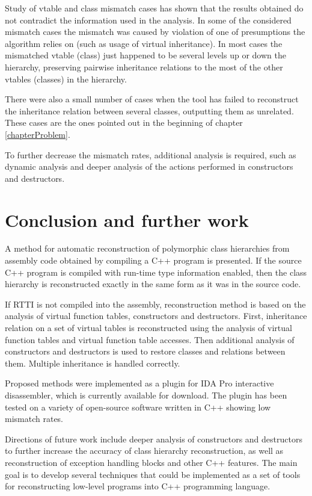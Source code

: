 \documentclass[10pt, conference]{IEEEtran}
\begin{document}
Study of vtable and class mismatch cases has shown that the results obtained
do not contradict the information used in the analysis. In some of the considered
mismatch cases the mismatch was caused by violation of one of presumptions
the algorithm relies on (such as usage of virtual inheritance).
In most cases the mismatched vtable (class) just happened to be
several levels up or down the hierarchy, preserving pairwise inheritance
relations to the most of the other vtables (classes) in the hierarchy.

There were also a small number of cases when the tool has failed to reconstruct
the inheritance relation between several classes, outputting them as unrelated.
These cases are the ones pointed out in the beginning of chapter \ref{chapterProblem}.

To further decrease the
mismatch rates, additional analysis is required, such as dynamic analysis
and deeper analysis of the actions performed in constructors and destructors.





\quad

\section{Conclusion and further work}
A method for automatic reconstruction of polymorphic class hierarchies
from assembly code obtained by compiling a C++ program is presented.
If the source C++ program is compiled with run-time type information enabled,
then the class hierarchy is reconstructed exactly in the same form as it
was in the source code.

If RTTI is not compiled into the assembly, reconstruction
method is based on the analysis of virtual function tables, constructors and destructors.
First, inheritance relation on a set of virtual tables is reconstructed using
the analysis of virtual function tables and virtual function table accesses.
Then additional analysis of constructors and destructors is used to restore
classes and relations between them. Multiple inheritance is handled
correctly.

Proposed methods were implemented as a plugin for IDA Pro interactive disassembler,
which is currently available for download.
The plugin has been tested on a variety of open-source software written in C++
showing low mismatch rates.

Directions of future work include deeper analysis of constructors
and destructors to further increase the accuracy of class hierarchy
reconstruction, as well as reconstruction of exception handling
blocks and other C++ features.
The main goal is to develop several techniques that could be implemented
as a set of tools for reconstructing low-level programs into C++ 
programming language.


\quad




\end{document}

